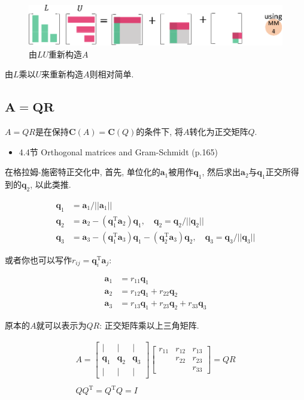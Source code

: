 \documentclass[letterpaper]{article}
\DeclareRobustCommand\transp{^{\mathrm{T}}}
\begin{document}
\begin{figure}[H]
  \centering
  \includegraphics[scale=0.8]{LU2.eps}
\caption{由$LU$重新构造$A$}
\end{figure}

由$L$乘以$U$来重新构造$A$则相对简单. 

\subsection{$\boldsymbol{A=QR}$}

$A=QR$是在保持$\bm{C}(A) = \bm{C}(Q)$的条件下, 将$A$转化为正交矩阵$Q$.

\begin{itemize}
  \item 4.4节 Orthogonal matrices and Gram-Schmidt (p.165)
\end{itemize}

在格拉姆-施密特正交化中, 首先, 单位化的$\bm{a}_1$被用作$\bm{q}_1$, 
然后求出$\bm{a}_2$与$\bm{q}_1$正交所得到的$\bm{q}_2$, 以此类推. 

\begin{align*}
  \bm{q}_1 &= \bm{a}_1/||\bm{a}_1|| \\
  \bm{q}_2 &= \bm{a}_2 - (\bm{q}_1\transp \bm{a}_2)\bm{q}_1 , \quad \bm{q}_2 = \bm{q}_2/||\bm{q}_2|| \\
  \bm{q}_3 &= \bm{a}_3 - (\bm{q}_1\transp \bm{a}_3)\bm{q}_1 - (\bm{q}_2\transp \bm{a}_3)\bm{q}_2, \quad \bm{q}_3 = \bm{q}_3/||\bm{q}_3||
\end{align*}

或者你也可以写作$r_{ij} = \bm{q}_i\transp \bm{a}_j$:

\begin{align*}
  \bm{a}_1 &= r_{11}\bm{q}_1\\
  \bm{a}_2 &= r_{12}\bm{q}_1 + r_{22} \bm{q}_2\\
  \bm{a}_3 &= r_{13}\bm{q}_1 + r_{23} \bm{q}_2 + r_{33} \bm{q}_3
\end{align*}

原本的$A$就可以表示为$QR$: 正交矩阵乘以上三角矩阵. 

\begin{gather*}
  A = 
  \begin{bmatrix}
    | & | & |\\
    \bm{q}_1 & \bm{q}_2 & \bm{q}_3\\
    | & | & |
  \end{bmatrix}
  \begin{bmatrix}
    r_{11} & r_{12} & r_{13}\\
           & r_{22} & r_{23}\\
           &        & r_{33}
  \end{bmatrix} = QR\\
  \\
  Q Q\transp=Q\transp Q = I
\end{gather*}
\end{document}
